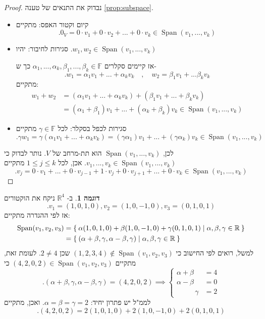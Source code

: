 \documentclass[12pt]{report}
\theoremstyle{plain}
\theoremstyle{definition}
\newtheorem{example}{דוגמה}[chapter]
\newcommand{\R}{\mathbb{R}}
\newcommand{\F}{\mathbb{F}}
\newcommand{\0}{\mathbf{0}}
\DeclareMathOperator{\Span}{Span}
\begin{document}
\begin{proof}
נבדוק את התנאים של טענה
\ref{prop:subspace}.

\begin{itemize}
\item
קיום וקטור האפס: מתקיים
$$
.0_V=0\cdot v_1+0\cdot v_2+...+0\cdot v_k\in\Span(v_1,...,v_k)
$$


\item
סגירות לחיבור: יהיו
$
.w_1,w_2\in\Span(v_1,...,v_k)
$

אז קיימים סקלרים
$\alpha_1,...,\alpha_k,\beta_1,...,\beta_k\in\F$
כך ש-
$$
.w_1=\alpha_1v_1+...+\alpha_kv_k\quad,\quad w_2=\beta_1v_1+...\beta_kv_k
$$
מתקיים:
$$
\begin{aligned}
w_1+w_2&=(\alpha_1v_1+...+\alpha_kv_k)+(\beta_1v_1+...+\beta_kv_k)\\
&=(\alpha_1+\beta_1)v_1+...+(\alpha_k+\beta_k)v_k\in\Span(v_1,...,v_k)
\end{aligned}
$$


\item
סגירות לכפל בסקלר: לכל
$\gamma\in\F$
מתקיים
$$
.\gamma w_1=\gamma(\alpha_1v_1+...+\alpha_kv_k)=(\gamma\alpha_1)v_1+...+(\gamma\alpha_k)v_k\in\Span(v_1,...,v_k)
$$
\end{itemize}


לכן,
$\Span(v_1,...,v_k)$
הוא תת-מרחב של
$V$. 
נותר לבדוק כי 
$v_1,...,v_k\in\Span(v_1,...,v_k)$.
אכן, לכל
$1\leq j\leq k$
מתקיים
$$
.v_j=0\cdot v_1+...+0\cdot v_{j-1}+1\cdot v_j+0\cdot v_{j+1}+...+0\cdot v_k\in\Span(v_1,...,v_k)
$$
\end{proof}

\begin{example}
ב-
$\R^4$
ניקח את הוקטורים
$$
.v_1=(1,0,1,0),v_2=(1,0,-1,0),v_3=(0,1,0,1)
$$
אז לפי ההגדרה מתקיים:
$$
\begin{aligned}
\Span(v_1,v_2,v_3)&=\Set{\alpha (1,0,1,0)+\beta (1,0,-1,0)+\gamma(0,1,0,1)|\alpha,\beta,\gamma\in\R} \\
&=\Set{(\alpha+\beta,\gamma,\alpha-\beta,\gamma)|\alpha,\beta,\gamma\in\R}
\end{aligned}
$$
למשל, רואים לפי החישוב כי
$(1,2,3,4)\notin\Span(v_1,v_2,v_3)$
שכן
$2\neq 4$.
לעומת זאת, מתקיים
$(4,2,0,2)\in\Span(v_1,v_2,v_3)$
כי
$$
.(\alpha+\beta,\gamma,\alpha-\beta,\gamma)=(4,2,0,2) \implies \begin{cases}
\alpha+\beta&=4 \\
\alpha-\beta&=0 \\
\phantom{\alpha+\beta}\,\gamma&=2
\end{cases}
$$
לממ"ל יש פתרון יחיד:
$\alpha=\beta=\gamma=2$.
ואכן, מתקיים
$$
.(4,2,0,2)=2(1,0,1,0)+2(1,0,-1,0)+2(0,1,0,1)
$$
\end{example}
\end{document}
